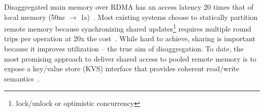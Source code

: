 
Disaggregated main memory over RDMA has an access latency 20 times that of local memory (50ns $\rightarrow$
1{\textmu}s)~\cite{clover}.  Most existing systems choose to statically partition remote memory because
synchronizing shared updates\footnote{lock/unlock or optimistic concurrency} requires multiple round
trips per operation at 20x the cost~\cite{kona,mira,aifm,trackfm,carbink}.
While hard to achieve, sharing is important because it improves utilization -- the true aim of
disaggregation.  To date, the most promising approach to deliver shared access to pooled remote
memory is to expose a key/value store (KVS) interface that provides coherent read/write
semantics~\cite{rolex,smart,ditto,fusee,clover,sherman,ford}.

